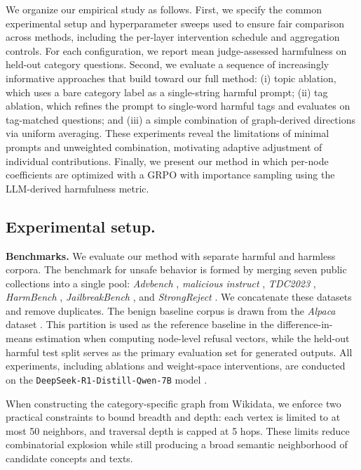 \documentclass{article}
\theoremstyle{plain}
\theoremstyle{definition}
\theoremstyle{remark}
\begin{document}
We organize our empirical study as follows. First, we specify the common experimental setup and hyperparameter sweeps used to ensure fair comparison across methods, including the per-layer intervention schedule and aggregation controls. For each configuration, we report mean judge-assessed harmfulness on held-out category questions. Second, we evaluate a sequence of increasingly informative approaches that build toward our full method: (i) topic ablation, which uses a bare category label as a single-string harmful prompt; (ii) tag ablation, which refines the prompt to single-word harmful tags and evaluates on tag-matched questions; and (iii) a simple combination of graph-derived directions via uniform averaging. These experiments reveal the limitations of minimal prompts and unweighted combination, motivating adaptive adjustment of individual contributions. Finally, we present our method in which per-node coefficients are optimized with a GRPO with importance sampling using the LLM-derived harmfulness metric.

\subsection{Experimental setup.} \label{subsec:exp_setup}
\textbf{Benchmarks.} We evaluate our method with separate harmful and harmless corpora. The benchmark for unsafe behavior is formed by merging seven public collections into a single pool: \textit{Advbench} \cite{chen2022should}, \textit{malicious instruct} \cite{huang2023catastrophic}, \textit{TDC2023} \cite{mazeika2024harmbench}, \textit{HarmBench} \cite{mazeika2024harmbench}, \textit{JailbreakBench} \cite{chao2024jailbreakbench}, and \textit{StrongReject} \cite{souly2024strongreject}. We concatenate these datasets and remove duplicates. The benign baseline corpus is drawn from the \textit{Alpaca} dataset \cite{taori2023alpaca}. This partition is used as the reference baseline in the difference-in-means estimation when computing node-level refusal vectors, while the held-out harmful test split serves as the primary evaluation set for generated outputs. All experiments, including ablations and weight-space interventions, are conducted on the \texttt{DeepSeek-R1-Distill-Qwen-7B} model \cite{bi2024deepseek}.

When constructing the category-specific graph from Wikidata, we enforce two practical constraints to bound breadth and depth: each vertex is limited to at most 50 neighbors, and traversal depth is capped at 5 hops. These limits reduce combinatorial explosion while still producing a broad semantic neighborhood of candidate concepts and texts.
\end{document}

